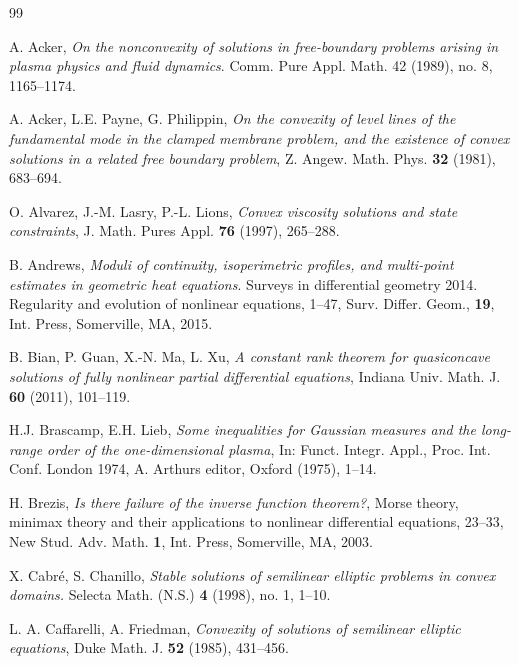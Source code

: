 \documentclass[reqno,12pt]{amsart}
\numberwithin{equation}{section}
\theoremstyle{remark}
\begin{document}
\begin{thebibliography}{99}

A. Acker, 
\emph{On the nonconvexity of solutions in free-boundary problems arising in plasma physics and fluid dynamics}.
Comm. Pure Appl. Math. 42 (1989), no. 8, 1165--1174.

A. Acker, L.E. Payne, G. Philippin, \emph{On the convexity of level lines of the fundamental mode in the clamped membrane problem, and the existence of convex solutions in a related free boundary problem}, Z. Angew. Math.
Phys. \textbf{32} (1981), 683--694.

O. Alvarez, J.-M. Lasry, P.-L. Lions, \emph{Convex viscosity solutions and state constraints}, J. Math. Pures Appl.
\textbf{76} (1997), 265--288.

B. Andrews, 
\emph{Moduli of continuity, isoperimetric profiles, and multi-point estimates in geometric heat equations}. Surveys in differential geometry 2014. Regularity and evolution of nonlinear equations, 1--47,
Surv. Differ. Geom., \textbf{19}, Int. Press, Somerville, MA, 2015.

B. Bian, P. Guan, X.-N. Ma, L. Xu,  \emph{A constant rank theorem for quasiconcave solutions of fully nonlinear
partial differential equations}, Indiana Univ. Math. J. \textbf{60} (2011), 101--119.

H.J. Brascamp, E.H. Lieb, \emph{Some inequalities for Gaussian measures and the long-range order of the one-dimensional plasma}, In: Funct. Integr. Appl., Proc. Int. Conf. London 1974, A. Arthurs editor, Oxford (1975), 1--14.

H. Brezis, 
\emph{Is there failure of the inverse function theorem?}, Morse theory, minimax theory and their applications to nonlinear differential equations, 23--33,
New Stud. Adv. Math. \textbf{1}, Int. Press, Somerville, MA, 2003.

X. Cabr\'e, S. Chanillo, \emph{Stable solutions of semilinear elliptic problems in convex domains.} 
Selecta Math. (N.S.) \textbf{4} (1998), no. 1, 1--10. 


L. A. Caffarelli, A. Friedman, \emph{Convexity of solutions of semilinear elliptic equations}, Duke Math. J. {\bf 52} (1985),
431--456.


\end{thebibliography}
\end{document}
